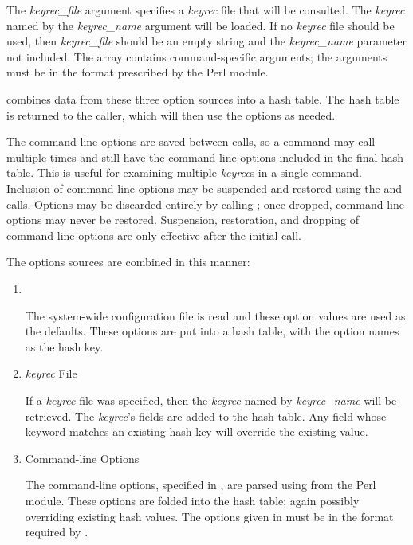 The {\it keyrec\_file} argument specifies a {\it keyrec} file that will be
consulted.  The {\it keyrec} named by the {\it keyrec\_name} argument will be
loaded.  If no {\it keyrec} file should be used, then {\it keyrec\_file} should
be an empty string and the {\it keyrec\_name} parameter not included.  The {\it
\@specopts} array contains command-specific arguments; the arguments must be in
the format prescribed by the  Perl module.

 combines data from these three option sources into a hash
table.  The hash table is returned to the caller, which will then use the
options as needed.

The command-line options are saved between calls, so a command may call
 multiple times and still have the command-line options
included in the final hash table.  This is useful for examining multiple {\it
keyrec}s in a single command.  Inclusion of command-line options may be
suspended and restored using the  and
 calls.  Options may be discarded entirely by calling
; once dropped, command-line options may never be restored.
Suspension, restoration, and dropping of command-line options are only
effective after the initial  call.

The options sources are combined in this manner:

\begin{enumerate}

\item {}\verb" "

The system-wide configuration file is read and these option values are used
as the defaults.  These options are put into a hash table, with the option
names as the hash key.

\item {\it keyrec} File\verb" "

If a {\it keyrec} file was specified, then the {\it keyrec} named by {\it
keyrec\_name} will be retrieved.  The {\it keyrec}'s fields are added to the
hash table.  Any field whose keyword matches an existing hash key will
override the existing value.

\item Command-line Options\verb" "

The command-line options, specified in {\it \@specopts}, are parsed using
 from the  Perl module.  These
options are folded into the hash table; again possibly overriding existing
hash values.  The options given in {\it \@specopts} must be in the format
required by .

\end{enumerate}

